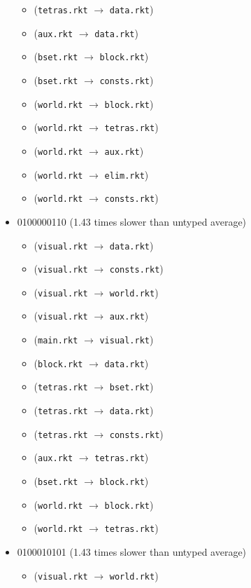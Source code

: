 \documentclass{article}
\newcommand{\mono}[1]{\texttt{#1}}
\begin{document}
\begin{itemize}
\begin{itemize}
  \item (\mono{tetras.rkt} $\rightarrow$ \mono{data.rkt})
  \item (\mono{aux.rkt} $\rightarrow$ \mono{data.rkt})
  \item (\mono{bset.rkt} $\rightarrow$ \mono{block.rkt})
  \item (\mono{bset.rkt} $\rightarrow$ \mono{consts.rkt})
  \item (\mono{world.rkt} $\rightarrow$ \mono{block.rkt})
  \item (\mono{world.rkt} $\rightarrow$ \mono{tetras.rkt})
  \item (\mono{world.rkt} $\rightarrow$ \mono{aux.rkt})
  \item (\mono{world.rkt} $\rightarrow$ \mono{elim.rkt})
  \item (\mono{world.rkt} $\rightarrow$ \mono{consts.rkt})
  \end{itemize}
\item 0100000110 (1.43 times slower than untyped average)
  \begin{itemize}
  \item (\mono{visual.rkt} $\rightarrow$ \mono{data.rkt})
  \item (\mono{visual.rkt} $\rightarrow$ \mono{consts.rkt})
  \item (\mono{visual.rkt} $\rightarrow$ \mono{world.rkt})
  \item (\mono{visual.rkt} $\rightarrow$ \mono{aux.rkt})
  \item (\mono{main.rkt} $\rightarrow$ \mono{visual.rkt})
  \item (\mono{block.rkt} $\rightarrow$ \mono{data.rkt})
  \item (\mono{tetras.rkt} $\rightarrow$ \mono{bset.rkt})
  \item (\mono{tetras.rkt} $\rightarrow$ \mono{data.rkt})
  \item (\mono{tetras.rkt} $\rightarrow$ \mono{consts.rkt})
  \item (\mono{aux.rkt} $\rightarrow$ \mono{tetras.rkt})
  \item (\mono{bset.rkt} $\rightarrow$ \mono{block.rkt})
  \item (\mono{world.rkt} $\rightarrow$ \mono{block.rkt})
  \item (\mono{world.rkt} $\rightarrow$ \mono{tetras.rkt})
  \end{itemize}
\item 0100010101 (1.43 times slower than untyped average)
  \begin{itemize}
  \item (\mono{visual.rkt} $\rightarrow$ \mono{world.rkt})

\end{itemize}
\end{itemize}
\end{document}
